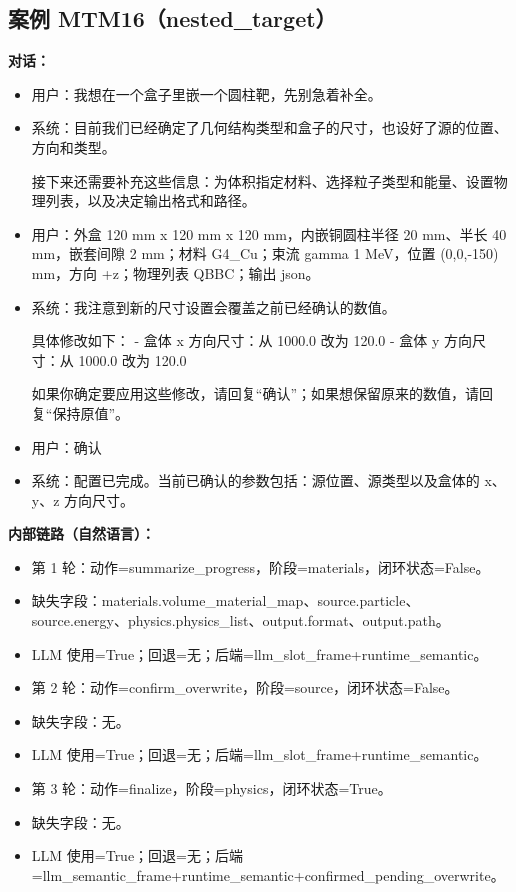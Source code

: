 \documentclass[11pt]{ctexart}
\begin{document}
\subsection{案例 MTM16（nested\_target）}
\textbf{对话：}
\begin{itemize}
\item 用户：我想在一个盒子里嵌一个圆柱靶，先别急着补全。
\item 系统：目前我们已经确定了几何结构类型和盒子的尺寸，也设好了源的位置、方向和类型。

接下来还需要补充这些信息：为体积指定材料、选择粒子类型和能量、设置物理列表，以及决定输出格式和路径。
\item 用户：外盒 120 mm x 120 mm x 120 mm，内嵌铜圆柱半径 20 mm、半长 40 mm，嵌套间隙 2 mm；材料 G4\_Cu；束流 gamma 1 MeV，位置 (0,0,-150) mm，方向 +z；物理列表 QBBC；输出 json。
\item 系统：我注意到新的尺寸设置会覆盖之前已经确认的数值。

具体修改如下：
- 盒体 x 方向尺寸：从 1000.0 改为 120.0
- 盒体 y 方向尺寸：从 1000.0 改为 120.0

如果你确定要应用这些修改，请回复“确认”；如果想保留原来的数值，请回复“保持原值”。
\item 用户：确认
\item 系统：配置已完成。当前已确认的参数包括：源位置、源类型以及盒体的 x、y、z 方向尺寸。
\end{itemize}
\textbf{内部链路（自然语言）：}
\begin{itemize}
\item 第 1 轮：动作=summarize\_progress，阶段=materials，闭环状态=False。
\item 缺失字段：materials.volume\_material\_map、source.particle、source.energy、physics.physics\_list、output.format、output.path。
\item LLM 使用=True；回退=无；后端=llm\_slot\_frame+runtime\_semantic。
\item 第 2 轮：动作=confirm\_overwrite，阶段=source，闭环状态=False。
\item 缺失字段：无。
\item LLM 使用=True；回退=无；后端=llm\_slot\_frame+runtime\_semantic。
\item 第 3 轮：动作=finalize，阶段=physics，闭环状态=True。
\item 缺失字段：无。
\item LLM 使用=True；回退=无；后端=llm\_semantic\_frame+runtime\_semantic+confirmed\_pending\_overwrite。
\end{itemize}
\end{document}
